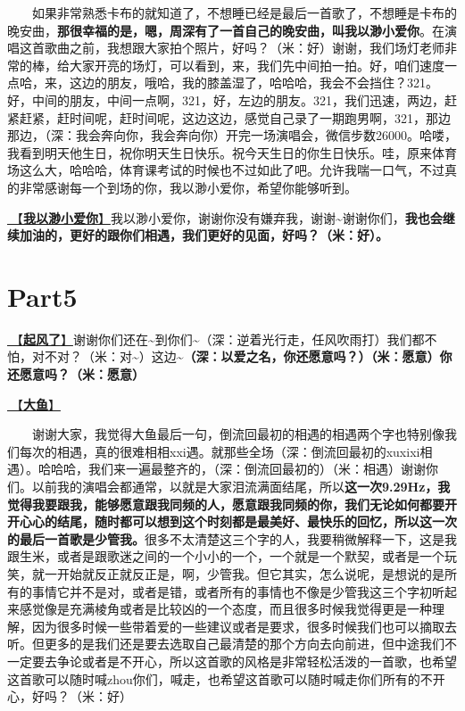 \documentclass[]{ctexbook}
\begin{document}
  如果非常熟悉卡布的就知道了，不想睡已经是最后一首歌了，不想睡是卡布的晚安曲，\textbf{那很幸福的是，嗯，周深有了一首自己的晚安曲，叫我以渺小爱你}。在演唱这首歌曲之前，我想跟大家拍个照片，好吗？（米：好）谢谢，我们场灯老师非常的棒，给大家开亮的场灯，可以看到，来，我们先中间拍一拍。好，咱们速度一点哈，来，这边的朋友，哦哈，我的膝盖湿了，哈哈哈，我会不会挡住？321。好，中间的朋友，中间一点啊，321，好，左边的朋友。321，我们迅速，两边，赶紧赶紧，赶时间呢，赶时间呢，这边这边，感觉自己录了一期跑男啊，321，那边那边，（深：我会奔向你，我会奔向你）开完一场演唱会，微信步数26000。哈喽，我看到明天他生日，祝你明天生日快乐。祝今天生日的你生日快乐。哇，原来体育场这么大，哈哈哈，体育课考试的时候也不过如此了吧。允许我喘一口气，不过真的非常感谢每一个到场的你，我以渺小爱你，希望你能够听到。

\hyperref[loving-you-in-my-humble-way]{🎵【\textbf{我以渺小爱你}】}我以渺小爱你，谢谢你没有嫌弃我，谢谢\textasciitilde 谢谢你们，\textbf{我也会继续加油的，更好的跟你们相遇，我们更好的见面，好吗？（米：好）。}

\section{Part5}\label{shenzhen-20240601-part5}

\hyperref[the-wind-rises]{🎵【\textbf{起风了}】}谢谢你们还在\textasciitilde 到你们\textasciitilde（深：逆着光行走，任风吹雨打）我们都不怕，对不对？（米：对\textasciitilde）这边\textasciitilde{}\textbf{（深：以爱之名，你还愿意吗？）（米：愿意）你还愿意吗？（米：愿意）}

\hyperref[big-fish]{🎵【\textbf{大鱼}】}

  谢谢大家，我觉得大鱼最后一句，倒流回最初的相遇的相遇两个字也特别像我们每次的相遇，真的很难相相xxi遇。就那些全场（深：倒流回最初的xuxixi相遇）。哈哈哈，我们来一遍最整齐的，（深：倒流回最初的）（米：相遇）谢谢你们。以前我的演唱会都通常，以就是大家泪流满面结尾，所以\textbf{这一次9.29Hz，我觉得我要跟我，能够愿意跟我同频的人，愿意跟我同频的你，我们无论如何都要开开心心的结尾，随时都可以想到这个时刻都是最美好、最快乐的回忆，所以这一次的最后一首歌是少管我。}很多不太清楚这三个字的人，我要稍微解释一下，这是我跟生米，或者是跟歌迷之间的一个小小的一个，一个就是一个默契，或者是一个玩笑，就一开始就反正就反正是，啊，少管我。但它其实，怎么说呢，是想说的是所有的事情它并不是对，或者是错，或者所有的事情也不像是少管我这三个字初听起来感觉像是充满棱角或者是比较凶的一个态度，而且很多时候我觉得更是一种理解，因为很多时候一些带着爱的一些建议或者是要求，很多时候我们也可以摘取去听。但更多的是我们还是要去选取自己最清楚的那个方向去向前进，但中途我们不一定要去争论或者是不开心，所以这首歌的风格是非常轻松活泼的一首歌，也希望这首歌可以随时喊zhou你们，喊走，也希望这首歌可以随时喊走你们所有的不开心，好吗？（米：好）
\end{document}
